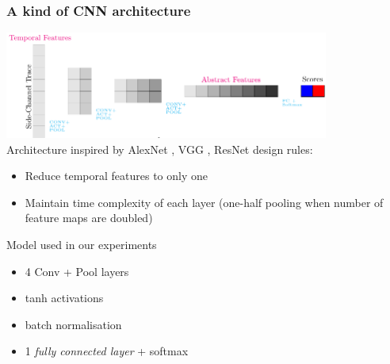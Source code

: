\begin{frame}
\frametitle{A kind of CNN architecture}
\vspace*{-10pt}
\includegraphics[width=0.8\textwidth]{../tikz_per_manuscritto/convnet_arch.pdf} \\
Architecture inspired by AlexNet \cite{KSH12}, VGG \cite{simonyan2014very}, ResNet \cite{he2016deep} design rules:
\begin{itemize}
\item Reduce temporal features to only one
\item Maintain time complexity of each layer (one-half pooling when number of feature maps are doubled)
\end{itemize}
\begin{block}{Model used in our experiments}
\begin{itemize}
\item 4 Conv + Pool layers
\item tanh activations
\item batch normalisation \cite{batch_norm}
\item 1 \emph{fully connected layer} + softmax
\end{itemize}
\end{block}

\end{frame}

